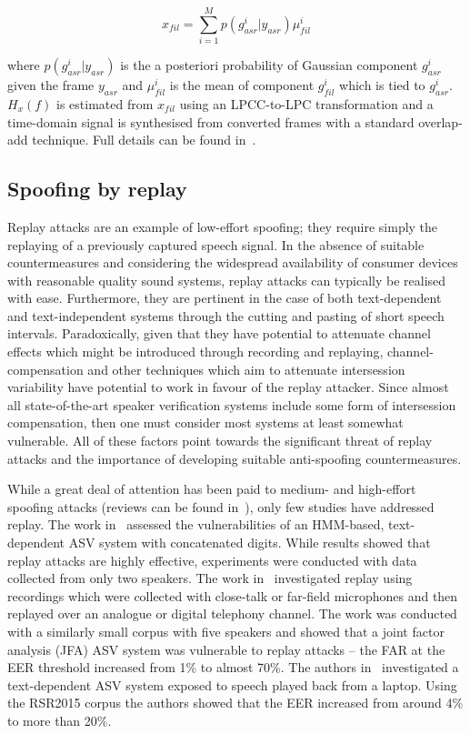 \begin{equation}
x_{fil} = \sum\limits_{i=1}^{M}p(g_{asr}^{i}|y_{asr}) \mu_{fil}^{i}
\label{eq:EMit}
\end{equation}

\noindent where $p(g_{asr}^{i}|y_{asr})$ is the a posteriori probability of Gaussian component $g_{asr}^{i}$ given the frame $y_{asr}$ and $\mu_{fil}^{i}$ is the mean of component $g_{fil}^{i}$ which is tied to $g_{asr}^{i}$.  $H_{x}(f)$ is estimated from $x_{fil}$ using an LPCC-to-LPC transformation and a time-domain signal is synthesised from converted frames with a standard overlap-add technique. Full details can be found in~\cite{Matrouf2005,Bonastre2006,Bonastre2007}.


\subsection{Spoofing by replay}

Replay attacks are an example of low-effort spoofing; they require simply the replaying of a previously captured speech signal.  
In the absence of suitable countermeasures and considering the widespread availability of consumer devices with reasonable quality sound systems, replay attacks can typically be realised with ease.  
Furthermore, they are pertinent in the case of both text-dependent and text-independent systems through the cutting and pasting of short speech intervals.  
Paradoxically, given that they have potential to attenuate channel effects which might be introduced through recording and replaying, channel-compensation and other techniques which aim to attenuate intersession variability have potential to work in favour of the replay attacker.
Since almost all state-of-the-art speaker verification systems include some form of intersession compensation, then one must consider most systems at least somewhat vulnerable. 
All of these factors point towards the significant threat of replay attacks and the importance of developing suitable anti-spoofing countermeasures.

While a great deal of attention has been paid to medium- and high-effort spoofing attacks (reviews can be found in~\cite{handbookChapter,Wu2014a}), only few studies have addressed replay.  
The work in~\cite{Lindberg1999} assessed the vulnerabilities of an HMM-based, text-dependent ASV system with concatenated digits.  
While results showed that replay attacks are highly effective, experiments were conducted with data collected from only two speakers.
The work in~\cite{Villalba2010} investigated replay using recordings which were collected with close-talk or far-field microphones and then replayed over an analogue or digital telephony channel. 
The work was conducted with a similarly small corpus with five speakers and showed that a joint factor analysis (JFA) ASV system was vulnerable to replay attacks -- the FAR at the EER threshold increased from 1\% to almost 70\%. The authors in~\cite{Wu2014} investigated a text-dependent ASV system exposed to speech played back from a laptop. Using the RSR2015 corpus the authors showed that the EER increased from around 4\% to more than 20\%.



